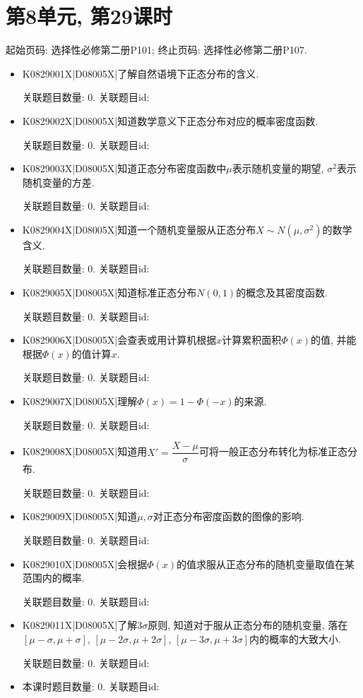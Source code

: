 \section*{第8单元, 第29课时}
起始页码: 选择性必修第二册P101; 终止页码: 选择性必修第二册P107.
\begin{itemize}
\item K0829001X|D08005X|了解自然语境下正态分布的含义.

关联题目数量: 0. 关联题目id: 

\item K0829002X|D08005X|知道数学意义下正态分布对应的概率密度函数.

关联题目数量: 0. 关联题目id: 

\item K0829003X|D08005X|知道正态分布密度函数中$\mu$表示随机变量的期望, $\sigma^2$表示随机变量的方差.

关联题目数量: 0. 关联题目id: 

\item K0829004X|D08005X|知道一个随机变量服从正态分布$X\sim N(\mu,\sigma^2)$的数学含义.

关联题目数量: 0. 关联题目id: 

\item K0829005X|D08005X|知道标准正态分布$N(0,1)$的概念及其密度函数.

关联题目数量: 0. 关联题目id: 

\item K0829006X|D08005X|会查表或用计算机根据$x$计算累积面积$\Phi(x)$的值, 并能根据$\Phi(x)$的值计算$x$.

关联题目数量: 0. 关联题目id: 

\item K0829007X|D08005X|理解$\Phi(x)=1-\Phi(-x)$的来源.

关联题目数量: 0. 关联题目id: 

\item K0829008X|D08005X|知道用$X'=\dfrac{X-\mu}{\sigma}$可将一般正态分布转化为标准正态分布.

关联题目数量: 0. 关联题目id: 

\item K0829009X|D08005X|知道$\mu,\sigma$对正态分布密度函数的图像的影响.

关联题目数量: 0. 关联题目id: 

\item K0829010X|D08005X|会根据$\Phi(x)$的值求服从正态分布的随机变量取值在某范围内的概率.

关联题目数量: 0. 关联题目id: 

\item K0829011X|D08005X|了解$3\sigma$原则, 知道对于服从正态分布的随机变量, 落在$[\mu-\sigma,\mu+\sigma]$, $[\mu-2\sigma,\mu+2\sigma]$, $[\mu-3\sigma,\mu+3\sigma]$内的概率的大致大小.

关联题目数量: 0. 关联题目id: 

\item 本课时题目数量: 0. 关联题目id: 

\end{itemize}

